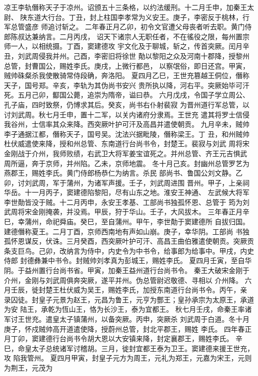 \documentclass[12pt,UTF8]{ctexbook}
\begin{document}
凉王李轨僭称天子于凉州。诏颁五十三条格，以约法缓刑。十二月壬申，加秦王太尉、
陕东道大行台。丁丑，封上柱国李孝常为义安王。庚子，李密反于桃林，行军总管盛彦
师追讨斩之。
二年春正月乙卯，初令文官遭父母丧者听去职。黄门侍郎陈叔达兼纳言。二月丙戌，
诏天下诸宗人无职任者，不在徭役之限，每州置宗师一人，以相统摄。丁酉，窦建德攻
宇文化及于聊城，斩之，传首突厥。闰月辛丑，刘武周侵我并州。己酉，李密旧将徐世
勣以黎阳之众及河南十郡降，授黎州总管，封曹国公，赐姓李氏。庚戌，上微行都邑，
以察氓俗，即日还宫。甲寅，贼帅硃粲杀我使散骑常侍段确，奔洛阳。
夏四月乙巳，王世充篡越王侗位，僭称天子，国号郑。辛亥，李轨为其伪尚书安兴
贵所执以降，河右平。突厥始毕可汗死。五月己卯，酅国公薨，追崇为隋帝，谥曰恭。
六月戊戌，令国子学立周公、孔子庙，四时致祭，仍博求其后。癸亥，尚书右仆射裴寂
为晋州道行军总管，以讨刘武周。秋七月壬申，置十二军，以关内诸府分隶焉。王世充
遣其将罗士信侵我谷州，士信率其众来降。西突厥叶护可汗及高昌并遣使朝贡。
九月辛未，贼帅李子通据江都，僭称天子，国号吴。沈法兴据毗陵，僭称梁王。丁
丑，和州贼帅杜伏威遣使来降，授和州总管、东南道行台尚书令，封楚王。裴寂与刘武
周将宋金刚战于介州，我师败绩，右武卫大将军姜宝谊死之。并州总管、齐王元吉惧武
周所逼，奔于京师，并州陷。乙未，京师地震。
冬十月己亥。封幽州总管罗艺为燕郡王，赐姓李氏。黄门侍郎杨恭仁为纳言。杀民
部尚书、鲁国公刘文静。乙卯，讨刘武周，军于蒲州，为诸军声援。壬子，刘武周进围
晋州。甲子，上亲祠华岳。十一月丙子，窦建德陷黎阳，尽有山东之地。淮安王神通、
左武候大将军李世勣皆没于贼。十二月丙申，永安王孝基、工部尚书独孤怀恩、总管于
筠为刘武周将宋金刚掩袭，并没焉。甲辰，狩于华山。壬子，大风拔木。
三年春正月辛巳，幸蒲州，命祀舜庙。癸巳，至自蒲州。甲午，李世勣于窦建德所
自拔归国。建德僭称夏王。二月丁酉，京师西南地有声如山崩。庚子，幸华阴。工部尚
书独孤怀恩谋反，伏诛。三月癸酉，西突厥叶护可汗、高昌王曲伯雅遣使朝贡。突厥贡
条支巨鸟。己卯，改纳言为侍中，内史令为中书令，给事郎为给事中。甲戌，内史侍郎
封德彝兼中书令。封贼帅刘孝真为彭城王，赐姓李氏。
夏四月壬寅，至自华阴。于益州置行台尚书省。甲寅，加秦王益州道行台尚书令。
秦王大破宋金刚于介州，金刚与刘武周俱奔突厥，遂平并州。伪总管尉迟敬德、寻相以
介州降。
六月壬辰，徙封楚王杜伏威为吴王，赐姓李氏，加授东南道行台尚书令。丙午，亲
录囚徒。封皇子元景为赵王，元昌为鲁王，元亨为酆王；皇孙承宗为太原王，承道为安
陆王，承乾为恆山王，恪为长沙王，泰为宜都王。
秋七月壬戌，命秦王率诸军讨王世充。遣皇太子镇蒲州，以备突厥。丙申，突厥杀
刘武周于白道。冬十月庚子，怀戍贼帅高开道遣使降，授蔚州总管，封北平郡王，赐姓
李氏。
四年春正月丁卯，窦建德行台尚书令胡大恩以大安镇来降，封定襄郡王，赐姓李氏。
辛巳，命皇太子总统诸军讨稽胡。三月，徙封宜都王泰为卫王。窦建德来援王世充，攻
陷我管州。
夏四月甲寅，封皇子元方为周王，元礼为郑王，元嘉为宋王，元则为荆王，元茂为
\end{document}
